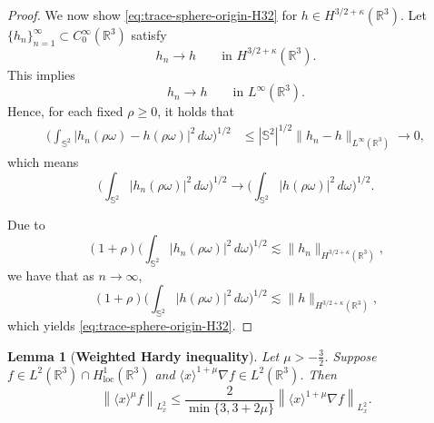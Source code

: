\documentclass[11pt,twoside]{article}
\theoremstyle{plain}
\newtheorem{lemma}[theorem]{Lemma}
\theoremstyle{definition}
\theoremstyle{assumption}
\numberwithin{equation}{section}
\begin{document}
\begin{proof}
		We now show \eqref{eq:trace-sphere-origin-H32} for $h\in H^{3/2+\kappa}(\mathbb R^3)$.
		Let $\{h_n\}_{n=1}^\infty\subset C_0^\infty(\mathbb R^3)$ satisfy
		\begin{equation*}
			h_n\to h
			\qquad\text{in }H^{3/2+\kappa}(\mathbb R^3).
		\end{equation*}
		This implies
		\begin{equation*}
			h_n\to h
			\qquad\text{in }L^\infty(\mathbb R^3).
		\end{equation*}
		Hence, for each fixed $\rho\ge0$, it holds that
		\begin{equation*}
			\begin{aligned}
				\big(
				\int_{\mathbb S^2}|h_n(\rho\omega)-h(\rho\omega)|^2\,d\omega
				\big)^{1/2}
				&\le
				|\mathbb S^2|^{1/2}
				\|h_n-h\|_{L^\infty(\mathbb R^3)}
				\to0,
			\end{aligned}
		\end{equation*}
		which means
		\begin{equation*}
			\big(
			\int_{\mathbb S^2}|h_n(\rho\omega)|^2\,d\omega
			\big)^{1/2}
			\to
			\big(
			\int_{\mathbb S^2}|h(\rho\omega)|^2\,d\omega
			\big)^{1/2}.
		\end{equation*}
		
		
		Due to
		\begin{equation*}
			(1+\rho)
			\big(
			\int_{\mathbb S^2}|h_n(\rho\omega)|^2\,d\omega
			\big)^{1/2}
			\lesssim
			\|h_n\|_{H^{3/2+\kappa}(\mathbb R^3)},
		\end{equation*}
		we have that as $n\to\infty$,
		\begin{equation*}
			(1+\rho)
			\big(
			\int_{\mathbb S^2}|h(\rho\omega)|^2\,d\omega
			\big)^{1/2}
			\lesssim
			\|h\|_{H^{3/2+\kappa}(\mathbb R^3)},
		\end{equation*}
		which yields \eqref{eq:trace-sphere-origin-H32}.
	\end{proof}
	
	
	
	
	
	
	
	
	\begin{lemma}[{\bf Weighted Hardy inequality}]
		\label{lem:weighted-Hardy-initial-displacement}
		Let \(\mu>-\frac32\). Suppose $f\in L^2(\mathbb R^3)\cap H^1_{\mathrm{loc}}(\mathbb R^3)$ and
		$\langle x\rangle^{1+\mu}\nabla f\in L^2(\mathbb R^3)$.
		Then
		\begin{equation}
			\label{eq:weighted-Hardy-for-initial-displacement}
			\left\|
			\langle x\rangle^\mu f
			\right\|_{L^2_x}
			\le
			\frac{2}{\min\{3,3+2\mu\}}
			\left\|
			\langle x\rangle^{1+\mu}\nabla f
			\right\|_{L^2_x}.
		\end{equation}
	\end{lemma}
	
\end{document}
